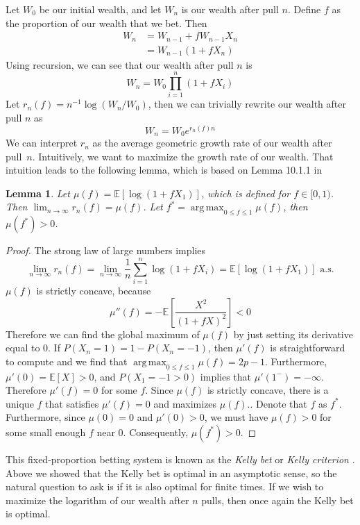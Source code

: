 \documentclass[letterpaper]{article}
\DeclareMathOperator*{\argmax}{arg\,max}
\numberwithin{equation}{section}
\theoremstyle{plain}
\newtheorem{lemma}{Lemma}[section]
\begin{document}
Let $W_0$ be our initial wealth, and let $W_n$ is our wealth after pull $n$. Define $f$ as the proportion of our wealth that we bet. Then
\begin{align}
W_n &= W_{n-1} +fW_{n-1} X_n\\
&= W_{n-1} (1+fX_n)
\end{align}
Using recursion, we can see that our wealth after pull $n$ is
\begin{equation}
W_n = W_0 \prod_{i=1}^n (1+f X_i)
\end{equation}
Let $r_n(f) = n^{-1} \log (W_n / W_0)$, then we can trivially rewrite our wealth after pull $n$ as
\begin{equation}
W_n = W_0 e^{r_n(f) n}
\end{equation}
We can interpret $r_n$ as the average geometric growth rate of our wealth after pull~$n$. Intuitively, we want to maximize the growth rate of our wealth. That intuition leads to the following lemma, which is based on Lemma 10.1.1 in \cite{ethier2010doctrine}
\begin{lemma}\label{kelly_asymp_growth}
Let $\mu(f) = \mathbb{E}[\log(1+fX_1)]$, which is defined for $f\in[0, 1)$. Then $\lim_{n\to\infty} r_n(f) = \mu(f)$. Let $f^* = \argmax_{0\le f\le 1} \mu(f)$, then $\mu(f^*) > 0$.
\end{lemma}
\begin{proof}
The strong law of large numbers implies
\begin{equation}
\lim_{n\to\infty}  r_n(f) = \lim_{n\to\infty} \frac{1}{n} \sum_{i=1}^n \log(1+f X_i) = \mathbb{E}[\log(1+fX_1)] \text{ a.s.}
\end{equation}
$\mu(f)$ is strictly concave, because
\begin{equation}
\mu''(f) = -\mathbb{E}\left[\frac{X^2}{(1+fX)^2}\right] < 0
\end{equation}
Therefore we can find the global maximum of $\mu(f)$ by just setting its derivative equal to 0. If $P(X_n = 1) = 1-P(X_n=-1)$, then $\mu'(f)$ is straightforward to compute and we find that $\argmax_{0\le f\le 1}\mu(f) = 2p-1$. Furthermore, $\mu'(0) =\mathbb{E}[X] > 0$, and $P(X_1 = -1 > 0)$ implies that $\mu'(1^-) = -\infty$. Therefore $\mu'(f) = 0$ for some $f$. Since $\mu(f)$ is strictly concave, there is a unique $f$ that satisfies $\mu'(f) = 0$ and maximizes $\mu(f)$.. Denote that $f$ as $f^*$. Furthermore, since $\mu(0) = 0$ and $\mu'(0) > 0$, we must have $\mu(f) > 0$ for some small enough $f$ near 0. Consequently, $\mu(f^*) > 0$.
\end{proof}
This fixed-proportion betting system is known as the \textit{Kelly bet} or \textit{Kelly criterion} \citep{kelly1956new,thorp2006kelly}. Above we showed that the Kelly bet is optimal in an asymptotic sense, so the natural question to ask is if it is also optimal for finite times. If we wish to maximize the logarithm of our wealth after $n$ pulls, then once again the Kelly bet is optimal.
\end{document}
